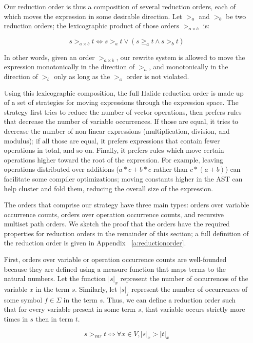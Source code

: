 \documentclass[sigplan,10pt,review,anonymous]{acmart}\settopmatter{printfolios=true,printccs=false,printacmref=false}
\begin{document}
Our reduction order is thus a composition of several reduction orders, each of
which moves the expression in some desirable direction. Let $>_a$ and $>_b$ be
two reduction orders; the lexicographic product of those orders $>_{a \times b}$
is:

\[
s >_{a \times b} t \iff s >_a t \vee (s \geq_a t \wedge s >_b t)
\] 

In other words, given an order $>_{a \times b}$, our rewrite system is allowed
to move the expression monotonically in the direction of $>_a$, and
monotonically in the direction of $>_b$ only as long as the $>_a$ order is not
violated.

Using this lexicographic composition, the full Halide reduction order is made up of a set of strategies for moving expressions through the expression space. The strategy first tries to reduce the number of vector operations, then prefers rules that decrease the number of variable occurrences. If those are equal, it tries to decrease the number of non-linear expressions (multiplication, division, and modulus); if all those are equal, it prefers expressions that contain fewer operations in total, and so on. Finally, it prefers rules which move certain operations higher toward the root of the expression. For example,
leaving operations distributed over additions ($a*c + b*c$ rather than
$c*(a +b)$) can facilitate some compiler optimizations; moving constants higher in the
AST can help cluster and fold them, reducing the overall size of the expression.

The orders that comprise our strategy have three main types: orders over variable
occurrence counts, orders over operation occurrence counts, and recursive
multiset path orders. We sketch the proof that the orders have the required
properties for reduction orders in the remainder of this section; a full
definition of the reduction order is given in Appendix ~\ref{a:reductionorder}.

First, orders over variable or operation occurrence counts are well-founded 
because they are defined using a measure function that maps terms to the natural
numbers. Let the function $|s|_x$ represent the number of occurrences of the
variable $x$ in the term $s$. Similarly, let $|s|_f$ represent the number of
occurrences of some symbol $f \in \Sigma$ in the term $s$. Thus, we can define a reduction order such that for every variable present in some term $s$, that variable occurs strictly more times in $s$ then in term $t$.

\begin{equation*}
s >_{var} t \iff \forall x \in V, |s|_x > |t|_x
\end{equation*}
\end{document}
